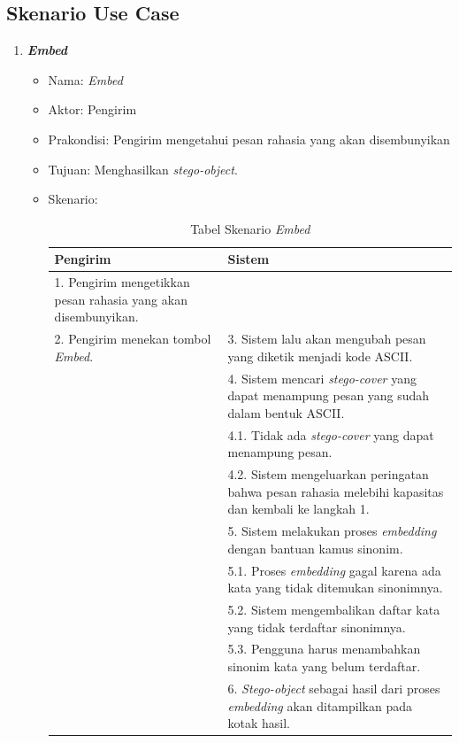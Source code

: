 \subsection{Skenario Use Case}

\begin{enumerate}
	\item \textbf{\textit{Embed}}
	\begin{itemize}
		\item Nama: \textit{Embed}
		\item Aktor: Pengirim
		\item Prakondisi: Pengirim mengetahui pesan rahasia yang akan disembunyikan
		\item Tujuan: Menghasilkan \textit{stego-object}.
		\item Skenario:
		\begin{table}[H]
		\centering
		\caption{Tabel Skenario \textit{Embed}}
		\begin{tabular}{| p{6.5cm} | p{6.5cm} |}\hline
		Pengirim & Sistem \\
		\hline
				1. Pengirim mengetikkan pesan rahasia yang akan disembunyikan. & \\
				\hline
				2. Pengirim menekan tombol \textit{Embed}. & 3. Sistem lalu akan mengubah pesan yang diketik menjadi kode ASCII. \\
				\hline
				& 4. Sistem mencari \textit{stego-cover} yang dapat menampung pesan yang sudah dalam bentuk ASCII. \\
				&	4.1. Tidak ada \textit{stego-cover} yang dapat menampung pesan.\\
				&	4.2. Sistem mengeluarkan peringatan bahwa pesan rahasia melebihi kapasitas dan kembali ke langkah 1.\\
				\hline
				& 5. Sistem melakukan proses \textit{embedding} dengan bantuan kamus sinonim. \\
				&	5.1. Proses \textit{embedding} gagal karena ada kata yang tidak ditemukan sinonimnya.\\
				&	5.2. Sistem mengembalikan daftar kata yang tidak terdaftar sinonimnya.\\
				&	5.3. Pengguna harus menambahkan sinonim kata yang belum terdaftar.\\
				\hline
				& 6. \textit{Stego-object} sebagai hasil dari proses \textit{embedding} akan ditampilkan pada kotak hasil.\\
		\hline
		\end{tabular}
		\end{table}
			

\end{itemize}
\end{enumerate}

